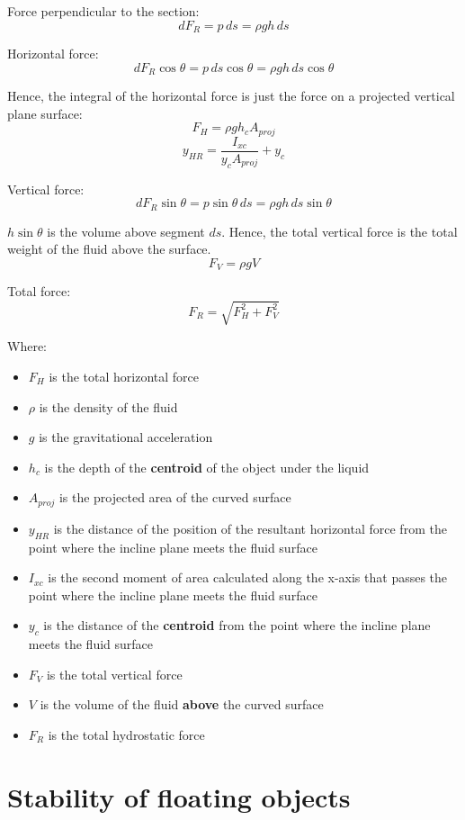 \documentclass[11pt]{article}
\begin{document}
Force perpendicular to the section:
\[dF_R = p \, ds = \rho g h \, ds\]

Horizontal force:
\[dF_R \cos \theta = p \, ds \cos \theta = \rho g h \, ds \cos \theta\]

Hence, the integral of the horizontal force is just the force on a projected vertical plane surface:
\[F_H = \rho g h_c A_{proj}\]
\[y_{HR} = \frac{I_{xc}}{y_c A_{proj}} + y_c\]

Vertical force:
\[dF_R \sin \theta = p \sin \theta \, ds = \rho g h \, ds \sin \theta\]

\(h \sin \theta\) is the volume above segment \(ds\). Hence, the total vertical force is the total weight of the fluid above the surface.
\[F_V = \rho g V\]

Total force:
\[F_R = \sqrt{F_H^2 + F_V^2}\]

\newpage

Where:
\begin{itemize}
\item \(F_H\) is the total horizontal force
\item \(\rho\) is the density of the fluid
\item \(g\) is the gravitational acceleration
\item \(h_c\) is the depth of the \textbf{centroid} of the object under the liquid
\item \(A_{proj}\) is the projected area of the curved surface
\item \(y_{HR}\) is the distance of the position of the resultant horizontal force from the point where the incline plane meets the fluid surface
\item \(I_{xc}\) is the second moment of area calculated along the x-axis that passes the point where the incline plane meets the fluid surface
\item \(y_c\) is the distance of the \textbf{centroid} from the point where the incline plane meets the fluid surface
\item \(F_V\) is the total vertical force
\item \(V\) is the volume of the fluid \textbf{above} the curved surface
\item \(F_R\) is the total hydrostatic force
\end{itemize}

\newpage
\section{Stability of floating objects}
\label{sec:orgbc1630d}
\end{document}
